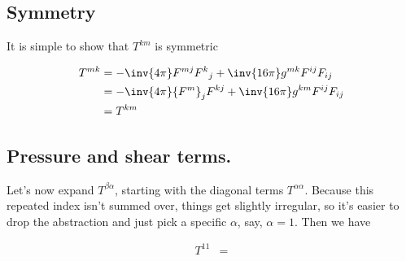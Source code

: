 \subsection{Symmetry}

It is simple to show that $T^{k m}$ is symmetric

\begin{align*}
T^{m k} 
&= -\inv{4\pi} F^{m j} {F^{k}}_j + \inv{16 \pi} g^{m k} F^{i j} F_{i j} \\
&= -\inv{4\pi} {F^{m}}_j F^{k j} + \inv{16 \pi} g^{k m} F^{i j} F_{i j} \\
&= T^{k m}
\end{align*}

\subsection{Pressure and shear terms.}

Let's now expand $T^{\beta \alpha}$, starting with the diagonal terms $T^{\alpha\alpha}$.  Because this repeated index isn't summed over, things get slightly irregular, so it's easier to drop the abstraction and just pick a specific $\alpha$, say, $\alpha = 1$.  Then we have

\begin{align*}
T^{1 1} &=
\end{align*}
